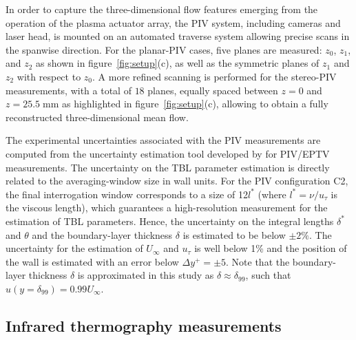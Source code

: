 In order to capture the three-dimensional flow features emerging from the operation of the plasma actuator array, the PIV system, including cameras and laser head, is mounted on an automated traverse system allowing precise scans in the spanwise direction. For the planar-PIV cases, five planes are measured: $z_0$, $z_1$, and $z_2$ as shown in figure~\ref{fig:setup}(c), as well as the symmetric planes of $z_1$ and $z_2$ with respect to $z_0$. A more refined scanning is performed for the stereo-PIV measurements, with a total of $18$ planes, equally spaced between $z=0$ and $z=25.5\;\mathrm{mm}$ as highlighted in figure~\ref{fig:setup}(c), allowing to obtain a fully reconstructed three-dimensional mean flow.

The experimental uncertainties associated with the PIV measurements are computed from the uncertainty estimation tool developed by \citet{Castellanos2021PIVuncertainty} for PIV/EPTV measurements. The uncertainty on the TBL parameter estimation is directly related to the averaging-window size in wall units. For the PIV configuration C2, the final interrogation window corresponds to a size of 12$l^*$ (where $l^* = \nu/u_\tau$ is the viscous length), which guarantees a high-resolution measurement for the estimation of TBL parameters. Hence, the uncertainty on the integral lengths $\delta^*$ and $\theta$ and the boundary-layer thickness $\delta$ is estimated to be below $\pm 2\%$. The uncertainty for the estimation of $U_\infty$ and $u_\tau$ is well below 1\% and the position of the wall is estimated with an error below $\Delta y^+ = \pm 5$. Note that the boundary-layer thickness $\delta$ is approximated in this study as $\delta \approx \delta_{99}$, such that $u(y=\delta_{99})=0.99U_\infty$.

\subsection{Infrared thermography measurements \label{ss:IR}}

